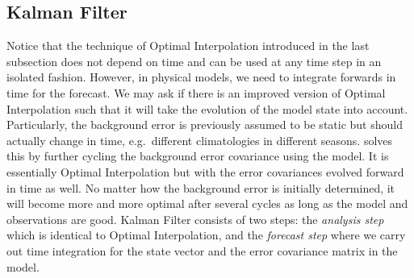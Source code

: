\subsection{Kalman Filter}

Notice that the technique of Optimal Interpolation introduced in the last subsection does not depend on time and can be used at any time step in an isolated fashion. However, in physical models, we need to integrate forwards in time for the forecast. We may ask if there is an improved version of Optimal Interpolation such that it will take the evolution of the model state into account. Particularly, the background error is previously assumed to be static but should actually change in time, e.g.\ different climatologies in different seasons.  solves this by further cycling the background error covariance using the model. It is essentially Optimal Interpolation but with the error covariances evolved forward in time as well. No matter how the background error is initially determined, it will become more and more optimal after several cycles as long as the model and observations are good. Kalman Filter consists of two steps: the \textit{analysis step} which is identical to Optimal Interpolation, and the \textit{forecast step} where we carry out time integration for the state vector and the error covariance matrix in the model.\par


